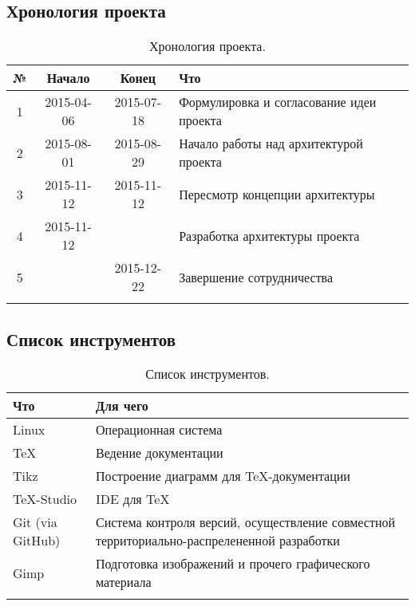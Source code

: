 \documentclass[12pt,a4paper,fullpage,titlepage]{article}
\begin{document}
\subsection{Хронология проекта}
\begin{table}[h]
\begin{tabularx}{\textwidth}{|c|c|c|X|}
	\hline
	№ & Начало & Конец & Что\\
	\hline
	1 & 2015-04-06 & 2015-07-18 & Формулировка и согласование идеи проекта \\
	\hline
	2 & 2015-08-01 & 2015-08-29 & Начало работы над архитектурой проекта \\
	\hline
	3 & 2015-11-12 & 2015-11-12 & Пересмотр концепции архитектуры \\
	\hline
	4 & 2015-11-12 &  & Разработка архитектуры проекта\\
	\hline
	5 &  & 2015-12-22 & Завершение сотрудничества \\
	\hline
	&  &  &  \\
	\hline
\end{tabularx}
\caption{Хронология проекта.}
\end{table}

\newpage
\subsection{Список инструментов}
\begin{table}[h]
	\begin{tabularx}{\textwidth}{|l|X|}
		\hline
		Что & Для чего \\
		\hline
		Linux & Операционная система\\
		\hline
		\TeX & Ведение документации\\
		\hline
		Tikz & Построение диаграмм для \TeX-документации\\
		\hline
		\TeX-Studio & IDE для \TeX \\
		\hline
		Git (via GitHub) & Система контроля версий, осуществление совместной территориально-распрелененной разработки \\
		\hline
		Gimp & Подготовка изображений и прочего графического материала \\
		\hline
		& \\
		\hline
	\end{tabularx}
	\caption{Список инструментов.}
\end{table}


\end{document}
